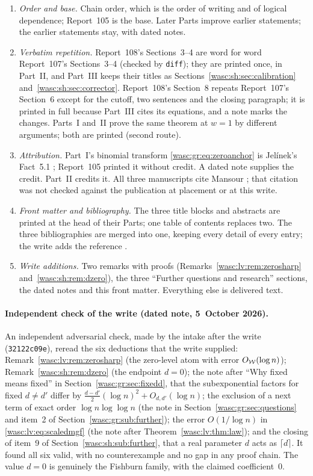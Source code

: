 \documentclass[11pt,a4paper]{article}
\theoremstyle{remark}\newtheorem{remark}[theorem]{Remark}
\numberwithin{equation}{section}
\begin{document}
\begin{enumerate}
\item \emph{Order and base.} Chain order, which is the order of writing and of logical dependence; Report~105 is the base. Later Parts improve earlier statements; the earlier statements stay, with dated notes.
\item \emph{Verbatim repetition.} Report~108's Sections~3--4 are word for word Report~107's Sections~3--4 (checked by \texttt{diff}); they are printed once, in Part~II, and Part~III keeps their titles as Sections~\ref{wasc:sh:sec:calibration} and~\ref{wasc:sh:sec:corrector}. Report~108's Section~8 repeats Report~107's Section~6 except for the cutoff, two sentences and the closing paragraph; it is printed in full because Part~III cites its equations, and a note marks the changes. Parts~I and~II prove the same theorem at $w=1$ by different arguments; both are printed (second route).
\item \emph{Attribution.} Part~I's binomial transform \eqref{wasc:gr:eq:zeroanchor} is Jel\'inek's Fact~5.1 \cite{jelinek}; Report~105 printed it without credit. A dated note supplies the credit. Part~II credits it. All three manuscripts cite Mansour \cite{mansour}; that citation was not checked against the publication at placement or at this write.
\item \emph{Front matter and bibliography.} The three title blocks and abstracts are printed at the head of their Parts; one table of contents replaces two. The three bibliographies are merged into one, keeping every detail of every entry; the write adds the reference \cite{dkrs}.
\item \emph{Write additions.} Two remarks with proofs (Remarks~\ref{wasc:lv:rem:zerosharp} and~\ref{wasc:sh:rem:dzero}), the three ``Further questions and research'' sections, the dated notes and this front matter. Everything else is delivered text.
\end{enumerate}

\paragraph{Independent check of the write (dated note, 5~October 2026).}
An independent adversarial check, made by the intake after the write (\texttt{32122c09e}), reread the six deductions that the write supplied: Remark~\ref{wasc:lv:rem:zerosharp} (the zero-level atom with error $O_{\mathcal W}(\log n)$); Remark~\ref{wasc:sh:rem:dzero} (the endpoint $d=0$); the note after ``Why fixed means fixed'' in Section~\ref{wasc:gr:sec:fixedd}, that the subexponential factors for fixed $d\ne d'$ differ by $\frac{d-d'}2(\log n)^2+O_{d,d'}(\log n)$; the exclusion of a next term of exact order $\log n\log\log n$ (the note in Section~\ref{wasc:gr:sec:questions} and item~2 of Section~\ref{wasc:gr:sub:further}); the error $O(1/\log n)$ in \eqref{wasc:lv:eq:scaledmgf} (the note after Theorem~\ref{wasc:lv:thm:law}); and the closing of item~9 of Section~\ref{wasc:sh:sub:further}, that a real parameter $d$ acts as $\lceil d\rceil$. It found all six valid, with no counterexample and no gap in any proof chain. The value $d=0$ is genuinely the Fishburn family, with the claimed coefficient~$0$.
\end{document}
